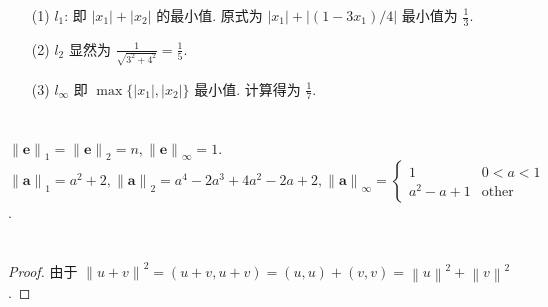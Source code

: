 \documentclass{article}
\begin{document}
\begin{itemize}
    \item [(1)] $l_1$: 即 $\left\lvert x_1\right\rvert + \left\lvert x_2\right\rvert $ 的最小值. 原式为 $\left\lvert x_1\right\rvert + \left\lvert (1 - 3x_1)/4\right\rvert$ 最小值为 $\frac{1}{3}$.
    \item [(2)] $l_2$ 显然为 $\frac{1}{\sqrt{3^2 + 4^2}} = \frac{1}{5}$.
    \item [(3)] $l_\infty$ 即 $\max \{\left\lvert x_1\right\rvert , \left\lvert x_2\right\rvert\}$ 最小值. 计算得为 $\frac{1}{7}$.
\end{itemize}

\section{}

$\left\lVert \boldsymbol{e}\right\rVert_1 = \left\lVert \boldsymbol{e}\right\rVert_2 = n, \left\lVert \boldsymbol{e}\right\rVert_\infty = 1$. \\
$\left\lVert \boldsymbol{a}\right\rVert_1 = a^2 + 2, \left\lVert \boldsymbol{a}\right\rVert_2 = a^4 -2a^3 + 4a^2 - 2a + 2, \left\lVert \boldsymbol{a}\right\rVert_\infty = \begin{cases}
    1 & 0 < a < 1 \\
    a^2 - a + 1 & \text{other}
\end{cases}$.

\section{}

\begin{proof}
    由于 $\left\lVert u + v\right\rVert^2 = (u + v, u + v) = (u, u) + (v, v) = \left\lVert u\right\rVert^2 + \left\lVert v\right\rVert^2 $.
\end{proof}
\end{document}
